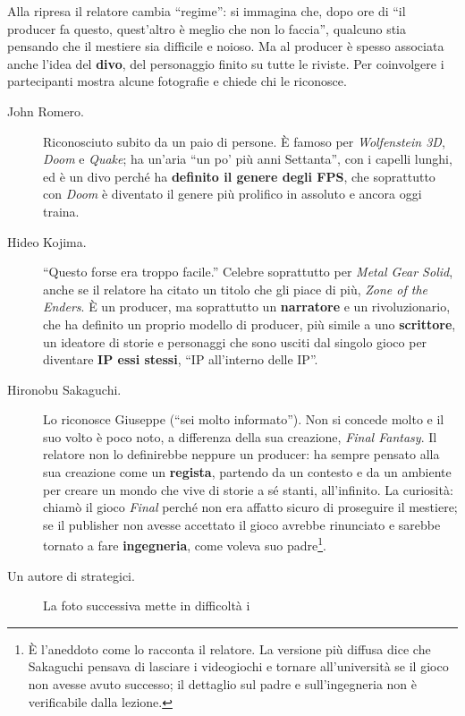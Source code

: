 Alla ripresa il relatore cambia ``regime'': si immagina che, dopo ore di ``il
producer fa questo, quest'altro è meglio che non lo faccia'', qualcuno stia
pensando che il mestiere sia difficile e noioso. Ma al producer è spesso
associata anche l'idea del \textbf{divo}, del personaggio finito su tutte le
riviste. Per coinvolgere i partecipanti mostra alcune fotografie e chiede chi le
riconosce.
\begin{description}
  \item[John Romero.] Riconosciuto subito da un paio di persone. È famoso per
        \emph{Wolfenstein 3D}, \emph{Doom} e \emph{Quake}; ha un'aria ``un po'
        più anni Settanta'', con i capelli lunghi, ed è un divo perché ha
        \textbf{definito il genere degli FPS}, che soprattutto con \emph{Doom} è
        diventato il genere più prolifico in assoluto e ancora oggi traina.
  \item[Hideo Kojima.] ``Questo forse era troppo facile.'' Celebre soprattutto
        per \emph{Metal Gear Solid}, anche se il relatore ha citato un titolo che
        gli piace di più, \emph{Zone of the Enders}. È un producer, ma
        soprattutto un \textbf{narratore} e un rivoluzionario, che ha definito un
        proprio modello di producer, più simile a uno \textbf{scrittore}, un
        ideatore di storie e personaggi che sono usciti dal singolo gioco per
        diventare \textbf{IP essi stessi}, ``IP all'interno delle IP''.
  \item[Hironobu Sakaguchi.] Lo riconosce Giuseppe (``sei molto informato'').
        Non si concede molto e il suo volto è poco noto, a differenza della sua
        creazione, \emph{Final Fantasy}. Il relatore non lo definirebbe neppure
        un producer: ha sempre pensato alla sua creazione come un
        \textbf{regista}, partendo da un contesto e da un ambiente per creare un
        mondo che vive di storie a sé stanti, all'infinito. La curiosità: chiamò
        il gioco \emph{Final} perché non era affatto sicuro di proseguire il
        mestiere; se il publisher non avesse accettato il gioco avrebbe
        rinunciato e sarebbe tornato a fare \textbf{ingegneria}, come voleva suo
        padre\footnote{È l'aneddoto come lo racconta il relatore. La versione
        più diffusa dice che Sakaguchi pensava di lasciare i videogiochi e
        tornare all'università se il gioco non avesse avuto successo; il
        dettaglio sul padre e sull'ingegneria non è verificabile dalla lezione.}.
  \item[Un autore di strategici.] La foto successiva mette in difficoltà i

\end{description}

